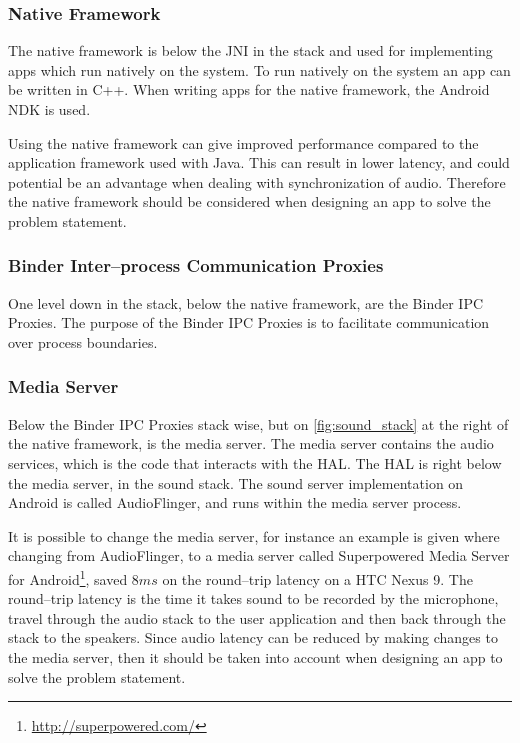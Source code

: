 \subsubsection*{Native Framework}
The native framework is below the \ac{JNI} in the stack and used for implementing apps which run natively on the system.
To run natively on the system an app can be written in C++.
When writing apps for the native framework, the Android \ac{NDK} is used.

Using the native framework can give improved performance compared to the application framework used with Java\cite{nat_perf_2}.
This can result in lower latency, and could potential be an advantage when dealing with synchronization of audio.
Therefore the native framework should be considered when designing an app to solve the problem statement.

\subsubsection*{Binder Inter--process Communication Proxies}
One level down in the stack, below the native framework, are the Binder \ac{IPC} Proxies.
The purpose of the Binder \ac{IPC} Proxies is to facilitate communication over process boundaries.

\subsubsection*{Media Server}
Below the Binder \ac{IPC} Proxies stack wise, but on \cref{fig:sound_stack} at the right of the native framework, is the media server.
The media server contains the audio services, which is the code that interacts with the \ac{HAL}.
The \ac{HAL} is right below the media server, in the sound stack.
The sound server implementation on Android is called AudioFlinger, and runs within the media server process\cite{audioflinger}.

It is possible to change the media server,
for instance an example is given where changing from AudioFlinger, to a media server called Superpowered Media Server for Android\footnote{\url{http://superpowered.com/}}, saved $8 ms$ on the round--trip latency on a HTC Nexus 9\cite{superpowered_8ms}.
The round--trip latency is the time it takes sound to be recorded by the microphone,
travel through the audio stack to the user application and then back through the stack to the speakers\cite{superpowered_8ms}.
Since audio latency can be reduced by making changes to the media server,
then it should be taken into account when designing an app to solve the problem statement.

